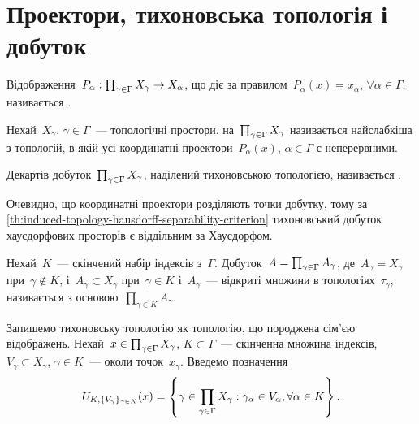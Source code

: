 \section{Проектори, тихоновська топологія і добуток}

\begin{definition}
    Відображення~$P_\alpha: \prod_{\gamma\in\Gamma}{X}_\gamma \to X_\alpha$, що діє за правилом~$P_\alpha(x) = x_\alpha$, $\forall \alpha \in \Gamma$, називається .
\end{definition}

\begin{definition}
    Нехай~$X_\gamma$, $\gamma \in \Gamma$~--- топологічні простори.  на~$\prod_{\gamma\in\Gamma}{X}_\gamma$ називається найслабкіша з топологій, в якій усі координатні проектори~$P_\alpha(x)$, $\alpha \in \Gamma$ є неперервними.
\end{definition}

\begin{definition}
    Декартів добуток~$\prod_{\gamma\in\Gamma}{X}_\gamma$, наділений тихоновською топологією, називається .
\end{definition}

\begin{remark}
    Очевидно, що координатні проектори розділяють точки добутку, тому за \cref{th:induced-topology-hausdorff-separability-criterion} тихоновський добуток хаусдорфових просторів є віддільним за Хаусдорфом.
\end{remark}

\begin{definition}
    Нехай~$K$~--- скінчений набір індексів з~$\Gamma$. Добуток~$A = \prod_{\gamma\in\Gamma}{A}_\gamma$, де~$A_\gamma =  X_\gamma$ при~$\gamma \notin K$, і~$A_\gamma \subset X_\gamma$ при~$\gamma \in K$ і~$A_\gamma$~--- відкриті множини в топологіях~$\tau_\gamma$, називається  з основою~$\prod_{\gamma \in K} A_\gamma$.
\end{definition}

Запишемо тихоновську топологію як топологію, що породжена сім'єю відображень. Нехай~$x \in \prod_{\gamma\in\Gamma}{X}_\gamma$, $K \subset \Gamma$~--- скінченна множина індексів, $V_\gamma \subset X_\gamma$, $\gamma \in K$~--- околи точок~$x_\gamma$. Введемо позначення
\begin{equation*}
    U_{K,\{V_\gamma\}_{\gamma\in K}}(x) =
    \left\{ \gamma \in \prod_{\gamma\in\Gamma}{X}_\gamma: \gamma_\alpha \in V_\alpha, \forall \alpha \in K \right\}.
\end{equation*}

